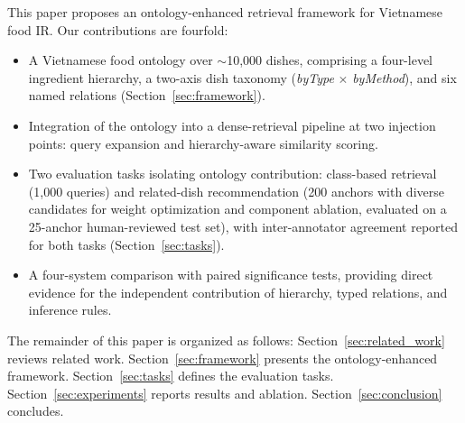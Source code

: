This paper proposes an ontology-enhanced retrieval framework for Vietnamese food IR. Our contributions are fourfold:
\begin{itemize}
  \item A Vietnamese food ontology over ${\sim}$10{,}000 dishes, comprising a four-level ingredient hierarchy, a two-axis dish taxonomy (\emph{byType} $\times$ \emph{byMethod}), and six named relations (Section~\ref{sec:framework}).
    \item Integration of the ontology into a dense-retrieval pipeline at two injection points: query expansion and hierarchy-aware similarity scoring.

    \item Two evaluation tasks isolating ontology contribution: class-based retrieval (1{,}000 queries) and related-dish recommendation (200 anchors with diverse candidates for weight optimization and component ablation, evaluated on a 25-anchor human-reviewed test set), with inter-annotator agreement reported for both tasks (Section~\ref{sec:tasks}).

  \item A four-system comparison with paired significance tests, providing direct evidence for the independent contribution of hierarchy, typed relations, and inference rules.
\end{itemize}

The remainder of this paper is organized as follows: Section~\ref{sec:related_work} reviews related work. Section~\ref{sec:framework} presents the ontology-enhanced framework. Section~\ref{sec:tasks} defines the evaluation tasks. Section~\ref{sec:experiments} reports results and ablation. Section~\ref{sec:conclusion} concludes.
